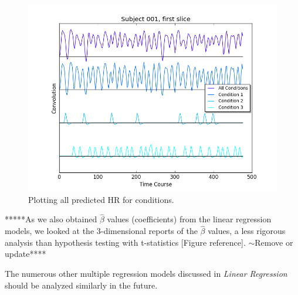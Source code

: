 \begin{figure}[ht]
\centering
\includegraphics[scale=.5]{../images/all_cond_time}  
\caption{Plotting all predicted HR for conditions.}
\label{fig:all_cond_time}
\end{figure}

*****As we also obtained $\hat{\beta}$ values (coefficients) from the linear 
regression models, we looked at the 3-dimensional reports of the 
$\hat{\beta}$ values, a less rigorous analysis than hypothesis testing with 
t-statistics [Figure reference]. $\sim$Remove or update****



The numerous other multiple regression models discussed in 
\textit{Linear Regression} should be analyzed similarly in the future. 
